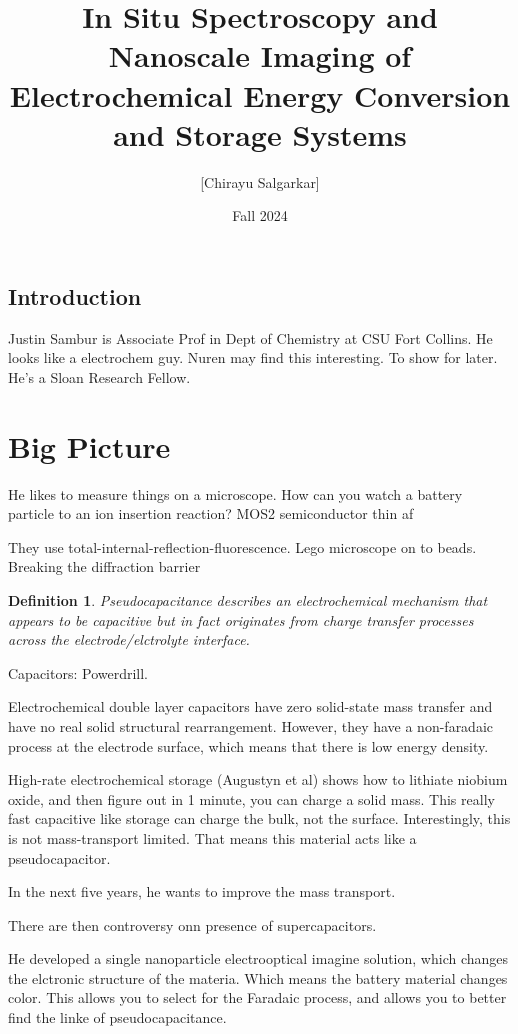 \documentclass[10pt, oneside]{article}
\title{In Situ Spectroscopy and Nanoscale Imaging of Electrochemical Energy Conversion and Storage Systems}
\author{[Chirayu Salgarkar]}
\date{Fall 2024}
\newtheorem{defn}{Definition}
\begin{document}
\maketitle
\tableofcontents

\vspace{.25in}


\subsection{Introduction}
Justin Sambur is Associate Prof in Dept of Chemistry at CSU Fort Collins. He looks like a electrochem guy. Nuren may find this interesting. To show for later. He's a Sloan Research Fellow. 
\section{Big Picture}
He likes to measure things on a microscope. How can you watch a battery particle to an ion insertion reaction? 
MOS2 semiconductor thin af

They use total-internal-reflection-fluorescence. Lego microscope on to beads. 
Breaking the diffraction barrier
\begin{defn}
Pseudocapacitance describes an electrochemical mechanism that appears to be capacitive but in fact originates from charge transfer processes across the electrode/elctrolyte interface.
\end{defn}

Capacitors: Powerdrill. 

Electrochemical double layer capacitors have zero solid-state mass transfer and have no real solid structural rearrangement. However, they have a non-faradaic process at the electrode surface, which means that there is low energy density. 


High-rate electrochemical storage (Augustyn et al) shows how to lithiate niobium oxide, and then figure out in 1 minute, you can charge a solid mass. This really fast capacitive like storage can charge the bulk, not the surface. Interestingly, this is not mass-transport limited. That means this material acts like a pseudocapacitor. 

In the next five years, he wants to improve the mass transport.

There are then controversy onn presence of supercapacitors. 

He developed a single nanoparticle electrooptical imagine solution, which changes the elctronic structure of the materia. Which means the battery material changes color. This allows you to select for the Faradaic process, and allows you to better find the linke of pseudocapacitance. 
\end{document}
